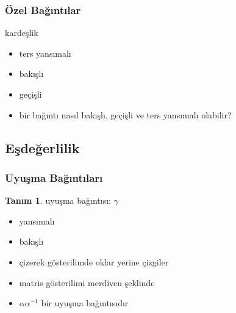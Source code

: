 \documentclass[dvipsnames]{beamer}
\theoremstyle{definition}
\newtheorem{tanim}[theorem]{Tanım}
\theoremstyle{example}
\theoremstyle{plain}
\begin{document}
\begin{frame}
  \frametitle{Özel Bağıntılar}

  \begin{block}{kardeşlik}
    \begin{itemize}
      \item ters yansımalı
      \item bakışlı
      \item geçişli
    \end{itemize}

    \pause
    \medskip
    \begin{itemize}
      \item bir bağıntı nasıl bakışlı, geçişli ve ters yansımalı olabilir?
    \end{itemize}
  \end{block}
\end{frame}

\subsection{Eşdeğerlilik}

\begin{frame}
  \frametitle{Uyuşma Bağıntıları}

  \begin{tanim}
    \alert{uyuşma bağıntısı}: $\gamma$
    \begin{itemize}
      \item yansımalı
      \item bakışlı
    \end{itemize}
  \end{tanim}

  \pause
  \begin{itemize}
    \item çizerek gösterilimde oklar yerine çizgiler
    \item matris gösterilimi merdiven şeklinde
  \end{itemize}

  \pause
  \begin{itemize}
    \item $\alpha \alpha^{-1}$ bir uyuşma bağıntısıdır
  \end{itemize}
\end{frame}
\end{document}

